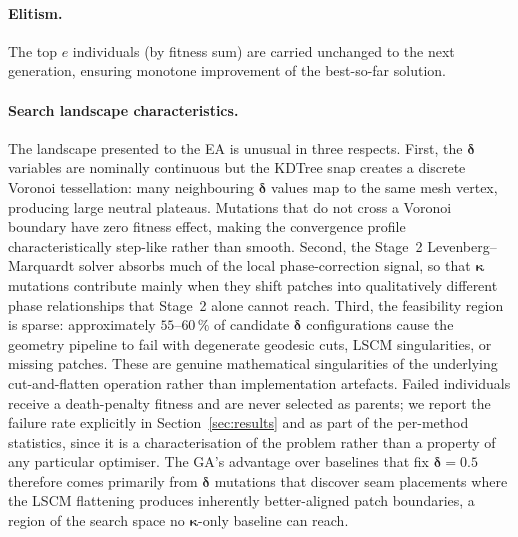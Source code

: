 \paragraph{Elitism.}
The top $e$ individuals (by fitness sum) are carried unchanged to the
next generation, ensuring monotone improvement of the best-so-far
solution.

\paragraph{Search landscape characteristics.}
The landscape presented to the EA is unusual in three respects.
First, the $\boldsymbol{\delta}$ variables are nominally continuous but the
KDTree snap creates a discrete Voronoi tessellation: many neighbouring
$\boldsymbol{\delta}$ values map to the same mesh vertex, producing large
neutral plateaus.
Mutations that do not cross a Voronoi boundary have zero fitness effect,
making the convergence profile characteristically step-like rather than
smooth.
Second, the Stage~2 Levenberg--Marquardt solver absorbs much of the local
phase-correction signal, so that $\boldsymbol{\kappa}$ mutations contribute
mainly when they shift patches into qualitatively different phase
relationships that Stage~2 alone cannot reach.
Third, the feasibility region is sparse: approximately $55$--$60\,\%$ of
candidate $\boldsymbol{\delta}$ configurations cause the geometry pipeline
to fail with degenerate geodesic cuts, LSCM singularities, or missing
patches. These are genuine mathematical singularities of the underlying
cut-and-flatten operation rather than implementation artefacts.
Failed individuals receive a death-penalty fitness and are never selected
as parents; we report the failure rate explicitly in
Section~\ref{sec:results} and as part of the per-method statistics, since
it is a characterisation of the problem rather than a property of any
particular optimiser.
The GA's advantage over baselines that fix $\boldsymbol{\delta} = 0.5$
therefore comes primarily from $\boldsymbol{\delta}$ mutations that
discover seam placements where the LSCM flattening produces inherently
better-aligned patch boundaries, a region of the search space no
$\boldsymbol{\kappa}$-only baseline can reach.
